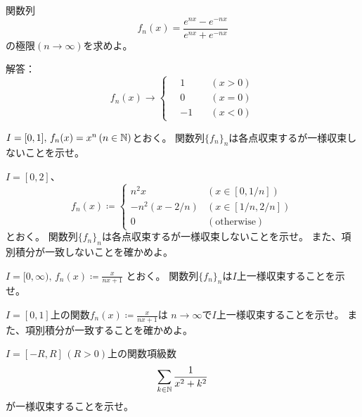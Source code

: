 \documentclass[report]{jlreq}
\begin{document}
\begin{problem}
    関数列
    \begin{equation}
        f_n(x) = \frac{e^{nx} - e^{-nx}}{e^{nx} + e^{-nx}}
    \end{equation}
    の極限$(n \to \infty)$を求めよ。

    解答：
    \begin{equation}
        f_n(x) \to \left\{\begin{alignedat}{2}
            \,&1 \quad &(x > 0) \\
            &0 \quad &(x = 0) \\
            &-1 \quad &(x < 0)
        \end{alignedat}
        \right.
    \end{equation}
\end{problem}

\begin{problem}
    $I = [0, 1],\, f_n(x) = x^n\, (n \in \mathbb{N})$とおく。
    関数列$\{f_n\}_n$は各点収束するが一様収束しないことを示せ。
\end{problem}

\begin{problem}
    $I = [0, 2]$、
    \begin{equation}
        f_n(x) \coloneqq \begin{cases}
            n^2 x &(x \in [0, 1/n]) \\
            -n^2 (x - 2/n) &(x \in [1/n, 2/n]) \\
            0 &(\text{otherwise})
        \end{cases}
    \end{equation}
    とおく。
    関数列$\{f_n\}_n$は各点収束するが一様収束しないことを示せ。
    また、項別積分が一致しないことを確かめよ。
\end{problem}

\begin{problem}
    $I = [0, \infty),\, f_n(x) \coloneqq \frac{x}{nx + 1}$
    とおく。
    関数列$\{f_n\}_n$は$I$上一様収束することを示せ。
\end{problem}

\begin{problem}
    $I = [0, 1]$上の関数$f_n(x) \coloneqq \frac{x}{nx + 1}$は
    $n \to \infty$で$I$上一様収束することを示せ。
    また、項別積分が一致することを確かめよ。
\end{problem}

\begin{problem}
    $I = [-R, R]\, (R > 0)$上の関数項級数
    \begin{equation}
        \sum_{k \in \mathbb{N}} \frac{1}{x^2 + k^2}
    \end{equation}
    が一様収束することを示せ。
\end{problem}
\end{document}
